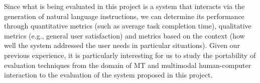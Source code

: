 Since what is being evaluated in this project is a system that interacts via the
generation of natural language instructions, we can determine its performance
through quantitative metrics (such as average task completion time), 
qualitative metrics (e.g., general user satisfaction) and metrics based on the
context (how well the system addressed the user needs in particular situations).
Given our previous experience, it is particularly
interesting for us to study the portability of evaluation
techniques from the domain of MT
and multimodal human-computer interaction to the evaluation of the system
proposed in this project.
